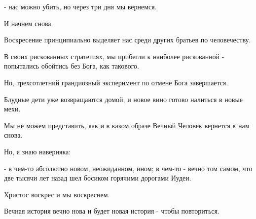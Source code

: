 - нас можно убить, но через три дня мы вернемся.

И начнем снова.

Воскресение принципиально выделяет нас среди других братьев по человечеству.

В своих рискованных стратегиях, мы прибегли к наиболее рискованной - попытались
обойтись без Бога, как такового.

Но, трехсотлетний грандиозный эксперимент по отмене Бога завершается.

Блудные дети уже возвращаются домой, и новое вино готово налиться в новые мехи.

Мы не можем представить, как и в каком образе Вечный Человек вернется к нам снова. 

Но, я знаю наверняка:

- в чем-то абсолютно новом, неожиданном, ином; в чем-то - вечно том самом, что
две тысячи лет назад шел босиком горячими дорогами Иудеи. 

Христос воскрес и мы воскреснем. 

Вечная история вечно нова и будет новая история - чтобы повториться.
